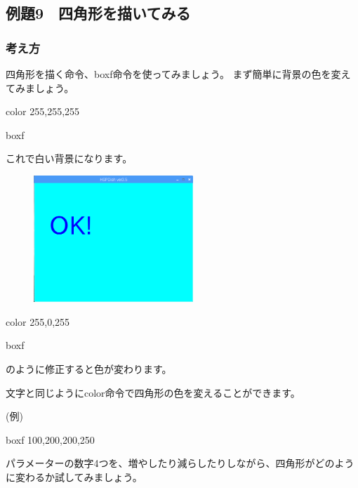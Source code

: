 \clearpage

\subsection{例題9　四角形を描いてみる}

\subsubsection*{考え方}

四角形を描く命令、boxf命令を使ってみましょう。
まず簡単に背景の色を変えてみましょう。

\begin{description}
    \item color 255,255,255
    \item boxf
\end{description}

これで白い背景になります。

\begin{figure}[H]
    \begin{center}
        \includegraphics[keepaspectratio,width=6.006cm,height=4.77cm]{text02-img/text02-img036.png}
    \end{center}
\end{figure}

\begin{description}
    \item color 255,0,255
    \item boxf
\end{description}

のように修正すると色が変わります。

文字と同じようにcolor命令で四角形の色を変えることができます。

\begin{description}
    \item (例)
    \item boxf 100,200,200,250
\end{description}

パラメーターの数字4つを、増やしたり減らしたりしながら、四角形がどのように変わるか試してみましょう。

